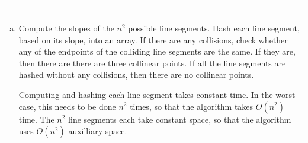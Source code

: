 \documentclass[11pt]{article}
\newcounter{questionCounter}
\newcounter{partCounter}[questionCounter]
\newenvironment{question}[2][\arabic{questionCounter}]{%
    \setcounter{partCounter}{0}%
    \vspace{.25in} \hrule \vspace{0.5em}%
        \noindent{\bf #2}%
    \vspace{0.8em} \hrule \vspace{.10in}%
    \addtocounter{questionCounter}{1}%
}{}
\begin{document}
\begin{question}{Collinearity}
\begin{enumerate}[(a)]
\item Compute the slopes of the $n^2$ possible line segments. Hash each line
segment, based on its slope, into an array. If there are any collisions, check
whether any of the endpoints of the colliding line segments are the same. If
they are, then there are there are three collinear points. If all the line
segments are hashed without any collisions, then there are no collinear
points.

Computing and hashing each line segment takes constant time. In the worst
case, this needs to be done $n^2$ times, so that the algorithm takes
$O(n^2)$ time. The $n^2$ line segments each take constant space, so that the
algorithm uses $O(n^2)$ auxilliary space.
\end{enumerate}
\end{question}
\end{document}
